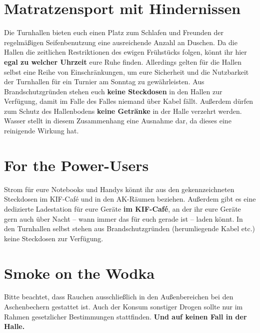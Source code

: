 \section*{Matratzensport mit Hindernissen}

Die Turnhallen bieten euch einen Platz zum Schlafen und Freunden der regelmäßigen Seifenbenutzung eine ausreichende Anzahl an Duschen.
Da die Hallen die zeitlichen Restriktionen des ewigen Frühstücks folgen, könnt ihr hier \textbf{egal zu welcher Uhrzeit} eure Ruhe finden.
Allerdings gelten für die Hallen selbst eine Reihe von Einschränkungen, um eure Sicherheit und die Nutzbarkeit der Turnhallen für ein Turnier am Sonntag zu gewährleisten.
Aus Brandschutzgründen stehen euch \textbf{keine Steckdosen} in den Hallen zur Verfügung, damit im Falle des Falles niemand über Kabel fällt.
Außerdem dürfen zum Schutz des Hallenbodens \textbf{keine Getränke} in der Halle verzehrt werden.
Wasser stellt in diesem Zusammenhang eine Ausnahme dar, da dieses eine reinigende Wirkung hat.

\section*{For the Power-Users}

Strom für eure Notebooks und Handys könnt ihr aus den gekennzeichneten Steckdosen im KIF-Café und in den AK-Räumen beziehen.
Außerdem gibt es eine dedizierte Ladestation für eure Geräte \textbf{im KIF-Café}, an der ihr eure Geräte gern auch über Nacht -- wann immer das für euch gerade ist -- laden könnt.
In den Turnhallen selbst stehen aus Brandschutzgründen (herumliegende Kabel etc.) keine Steckdosen zur Verfügung.

\section*{Smoke on the Wodka}

Bitte beachtet, dass Rauchen ausschließlich in den Außenbereichen bei den Aschenbechern gestattet ist.
Auch der Konsum sonstiger Drogen sollte nur im Rahmen gesetzlicher Bestimmungen stattfinden. \textbf{Und auf keinen Fall in der Halle.}
